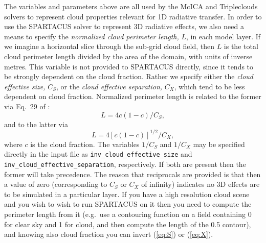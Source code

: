 \documentclass[a4,oneside]{article}
\def\codesize{\small}
\def\code#1{{\codesize\texttt{#1}}}
\begin{document}
The variables and parameters above are all used by the McICA and
Tripleclouds solvers to represent cloud properties relevant for 1D
radiative transfer.  In order to use the SPARTACUS solver to represent
3D radiative effects, we also need a means to specify the
\emph{normalized cloud perimeter length,} $L$, in each model layer.
If we imagine a horizontal slice through the sub-grid cloud field,
then $L$ is the total cloud perimeter length divided by the area of
the domain, with units of inverse metres. This variable is not
provided to SPARTACUS directly, since it tends to be strongly
dependent on the cloud fraction.  Rather we specify either the
\emph{cloud effective size,} $C_S$, or the \emph{cloud effective
  separation,} $C_X$, which tend to be less dependent on cloud fraction.
Normalized perimeter length is related to the former via Eq.\ 29 of
\cite{Hogan+2019}:
%
\begin{equation}
  L=4c(1-c)/C_S,\label{eq:S}
\end{equation}
%
and to the latter via \cite[]{Fielding+2020}
%
\begin{equation}
  L=4\left[c(1-c)\right]^{1/2}/C_X,\label{eq:X}
\end{equation}
%
where $c$ is the cloud fraction. The variables $1/C_S$ and $1/C_X$ may
be specified directly in the input file as
\code{inv\_cloud\_effective\_size} and
\code{inv\_cloud\_effective\_separation}, respectively. If both are
present then the former will take precedence. The reason that
reciprocals are provided is that then a value of zero (corresponding
to $C_S$ or $C_X$ of infinity) indicates no 3D effects are to be simulated
in a particular layer. If you have a high resolution cloud scene and
you wish to wish to run SPARTACUS on it then you need to compute the
perimeter length from it (e.g.\ use a contouring function on a field
containing 0 for clear sky and 1 for cloud, and then compute the
length of the 0.5 contour), and knowing also cloud fraction you can
invert (\ref{eq:S}) or (\ref{eq:X}).
\end{document}

